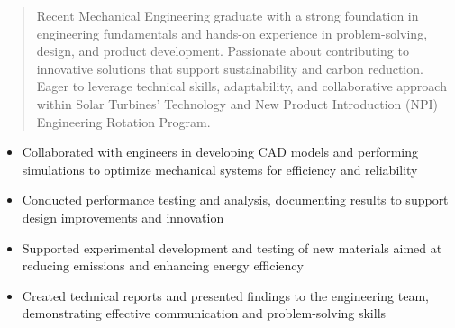 



\makecvheader

\begin{quote}
  \noindent
  Recent Mechanical Engineering graduate with a strong foundation in engineering fundamentals and hands-on experience in problem-solving, design, and product development. Passionate about contributing to innovative solutions that support sustainability and carbon reduction. Eager to leverage technical skills, adaptability, and collaborative approach within Solar Turbines’ Technology and New Product Introduction (NPI) Engineering Rotation Program.
\end{quote}

\par\smallskip
\noindent
\begin{minipage}{20cm}
  \begin{minipage}{9.75cm}
    \begin{itemize}
      \item Collaborated with engineers in developing CAD models and performing simulations to optimize mechanical systems for efficiency and reliability
      \item Conducted performance testing and analysis, documenting results to support design improvements and innovation
    \end{itemize}
  \end{minipage}
  \hfill
  \begin{minipage}{9.75cm}
    \begin{itemize}
      \item Supported experimental development and testing of new materials aimed at reducing emissions and enhancing energy efficiency
      \item Created technical reports and presented findings to the engineering team, demonstrating effective communication and problem-solving skills
    \end{itemize}
  \end{minipage}
\end{minipage}
\par\smallskip
\divider

